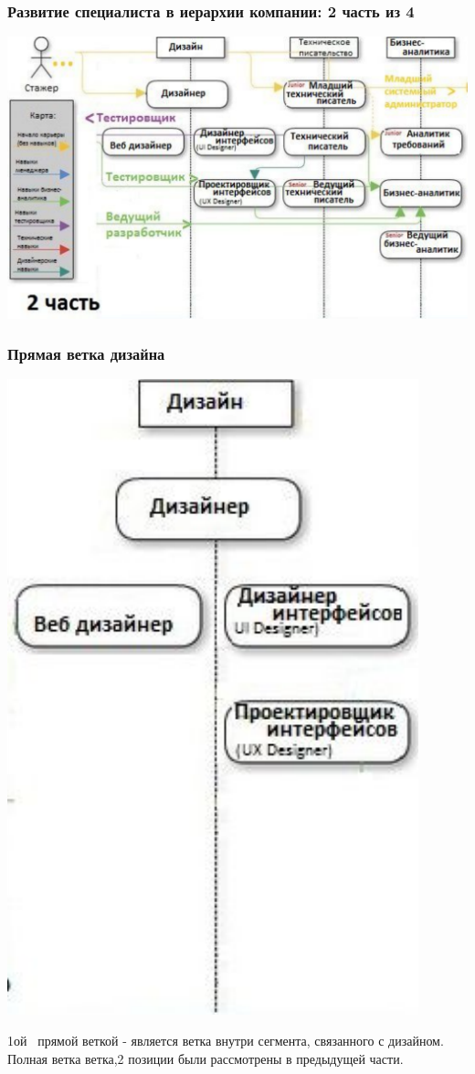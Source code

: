 \documentclass{../industrial-development}
\begin{document}
{\begin{frame} \frametitle{Развитие  специалиста в иерархии компании: 2 часть из 4 }
  \centerline{\includegraphics[width=1\linewidth]{11-IT-specialist's-way/sch12.pdf}}
\end{frame}

\begin{frame} \frametitle{Прямая ветка дизайна }
  \centerline{\includegraphics[width=0.42\linewidth]{11-IT-specialist's-way/sch12a.pdf}}
\end{frame}

\lecturenotes
 1ой~\cite{mc} прямой веткой  - является ветка внутри сегмента, связанного с дизайном. Полная ветка ветка,2 позиции были рассмотрены в предыдущей части.


}
\end{document}
